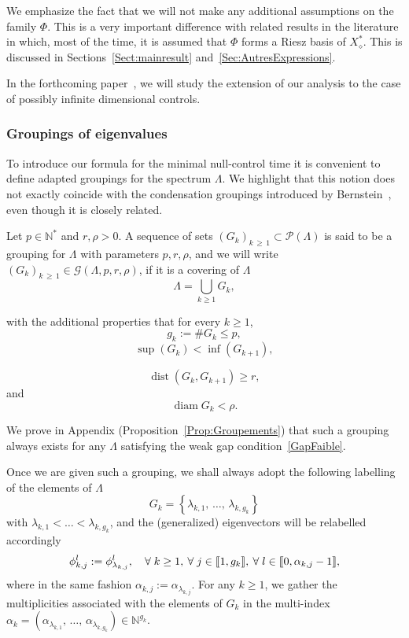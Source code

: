 \documentclass[AHL,Unicode,longabstracts]{cedram}
\newcommand{\llbracket}{\mathopen{[\mkern -2.7mu[}}
\newcommand{\rrbracket}{\mathclose{]\mkern -2.7mu]}}
\newcommand{\inter}[2]{\llbracket #1,#2 \rrbracket}
\newcommand{\Xalphas}{X_\diamond^*}
\newcommand{\n}{g}
\newcommand{\N}{\mathbb{N}}
\DeclareMathOperator{\diam}{diam}
\DeclareMathOperator{\dist}{dist}
\let\oldforall\forall
\renewcommand*{\forall}{\mathrel{\oldforall}}
\begin{document}
We emphasize the fact that we will not make any additional assumptions on the family $\Phi$. This is a very important difference with related results in the literature in which, most of the time, it is assumed that $\Phi$ forms a Riesz basis of $\Xalphas$. This is discussed in Sections~\ref{Sect:mainresult} and~\ref{Sec:AutresExpressions}.


In the forthcoming paper~\cite{BoyerMorancey}, we will study the extension of our analysis to the case of possibly infinite dimensional controls.


\subsubsection{Groupings of eigenvalues} \label{Sec:Groupings}
To introduce our formula for the minimal null-control time it is convenient to define adapted groupings for the spectrum $\Lambda$. We highlight that this notion does not exactly coincide with the condensation groupings introduced by Bernstein~\cite{Bernstein33}, even though it is closely related.
\begin{defi} \label{Def:Groupements}
Let $p \in \N^*$ and $r,\rho >0$. A sequence of sets $(G_k)_{k\,\geq\,1} \subset \mathcal{P}(\Lambda)$ is said to be a grouping for $\Lambda$ with parameters $p, r, \rho$, and we will write $(G_k)_{k\,\geq \,1} \in \mathcal{G}(\Lambda,p,r,\rho)$, if it is a covering of $\Lambda$
\[
\Lambda = \bigcup\limits_{k \geq 1} G_k,
\]
\goodbreak

with the additional properties that for every $k \geq 1$,
\[
\n_k := \# G_k \leq p,
\]
\[
\sup(G_k) < \inf(G_{k+1}),
\]

\begin{equation}\label{ConstructionGroupement_distance}
\dist (G_k, G_{k+1}) \geq r,
\end{equation}
and
\begin{equation}\label{ConstructionGroupement_diametre}
\diam G_k < \rho.
\end{equation}
\end{defi}

We prove in Appendix (Proposition~\ref{Prop:Groupements}) that such a grouping always exists for any $\Lambda$ satisfying the weak gap condition~\eqref{GapFaible}.

Once we are given such a grouping, we shall always adopt the following labelling of the elements of $\Lambda$
\[
G_k = \left\{ \lambda_{k,1},\,\dots,\, \lambda_{k,\n_k} \right\}
\]
with $\lambda_{k,1} < \dots < \lambda_{k,\n_k}$, and the (generalized) eigenvectors will be relabelled accordingly
\[
\phi_{k,j}^l := \phi_{\lambda_{k,j}}^l, \quad \forall k\geq 1, \: \forall j\in \inter{1}{\n_k}, \: \forall l \in \inter{0}{\alpha_{k,j}-1},
\]
where in the same fashion $\alpha_{k,j} := \alpha_{\lambda_{k,j}}$. For any $k \geq 1$, we gather the multiplicities associated with the elements of $G_k$ in the multi-index $\alpha_k=(\alpha_{\lambda_{k,1}},\,\dotsc,\, \alpha_{\lambda_{k,\n_k}})\in \N^{\n_k}$.
\end{document}
